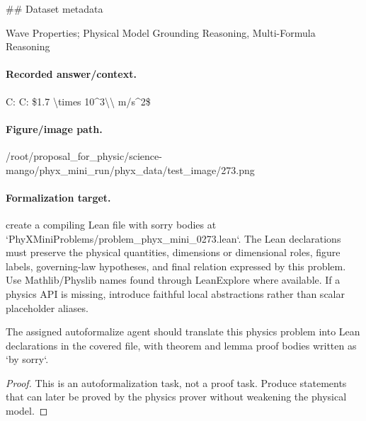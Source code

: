 \#\# Dataset metadata

Wave Properties; Physical Model Grounding Reasoning, Multi-Formula Reasoning

\paragraph{Recorded answer/context.}
C: C: \$1.7 \textbackslash{}times 10\textasciicircum{}3\textbackslash{}\textbackslash{} m/s\textasciicircum{}2\$

\paragraph{Figure/image path.}
/root/proposal\_for\_physic/science-mango/phyx\_mini\_run/phyx\_data/test\_image/273.png

\paragraph{Formalization target.}
create a compiling Lean file with sorry bodies at `PhyXMiniProblems/problem\_phyx\_mini\_0273.lean`. The Lean declarations must preserve the physical quantities, dimensions or dimensional roles, figure labels, governing-law hypotheses, and final relation expressed by this problem.
Use Mathlib/Physlib names found through LeanExplore where available. If a physics API is missing, introduce faithful local abstractions rather than scalar placeholder aliases.

\begin{theorem}
\label{thm:physics:phyx_mini_0273:target}
The assigned autoformalize agent should translate this physics problem into Lean declarations in the covered file, with theorem and lemma proof bodies written as `by sorry`.
\end{theorem}
\begin{proof}
This is an autoformalization task, not a proof task. Produce statements that can later be proved by the physics prover without weakening the physical model.
\end{proof}

